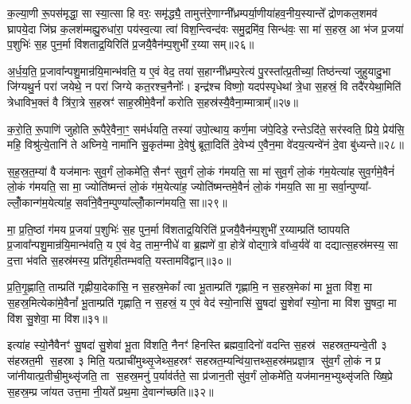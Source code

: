 क॒ल्या॒णी रू॒पस॑मृद्धा॒ सा स्या॒त्सा हि वरः॒ समृ॑द्ध्यै॒ तामुत्त॑रे॒णाग्नी᳚ध्रम्पर्या॒णीया॑हव॒नीय॒स्यान्ते᳚ द्रोणकल॒शमव॑ घ्रापये॒दा जि॑घ्र क॒लश॑म्मह्यु॒रुधा॑रा॒ पय॑स्व॒त्या त्वा॑ विश॒न्त्विन्द॑वः समु॒द्रमि॑व॒ सिन्ध॑वः॒ सा मा॑ स॒हस्र॒ आ भ॑ज प्र॒जया॑ प॒शुभिः॑ स॒ह पुन॒र्मा वि॑शताद्र॒यिरिति॑ प्र॒जयै॒वैन॑म्प॒शुभी॑ र॒य्या सम्॥२६॥

अ॒र्ध॒य॒ति॒ प्र॒जावा᳚न्पशु॒मान्र॑यि॒मान्भ॑वति॒ य ए॒वं वेद॒ तया॑ स॒हाग्नी᳚ध्रम्प॒रेत्य॑ पु॒रस्ता᳚त्प्र॒तीच्यां॒ तिष्ठ॑न्त्यां जुहुयादु॒भा जि॑ग्यथु॒र्न परा॑ जयेथे॒ न परा॑ जिग्ये कत॒रश्च॒नैनोः᳚। इन्द्र॑श्च विष्णो॒ यदप॑स्पृधेथां त्रे॒धा स॒हस्रं॒ वि तदै॑रयेथा॒मिति॑ त्रेधाविभ॒क्तं वै त्रि॑रा॒त्रे स॒हस्रꣳ॑ साह॒स्रीमे॒वैनां᳚ करोति स॒हस्र॑स्यै॒वैना॒म्मात्राम्᳚॥२७॥

क॒रो॒ति॒ रू॒पाणि॑ जुहोति रू॒पैरे॒वैना॒ꣳ॒ सम॑र्धयति॒ तस्या॑ उपो॒त्थाय॒ कर्ण॒मा ज॑पे॒दिडे॒ रन्ते\-ऽदि॑ते॒ सर॑स्वति॒ प्रिये॒ प्रेय॑सि॒ महि॒ विश्रु॑त्ये॒तानि॑ ते अघ्निये॒ नामा॑नि सु॒कृत॑म्मा दे॒वेषु॑ ब्रूता॒दिति॑ दे॒वेभ्य॑ ए॒वैन॒मा वे॑दय॒त्यन्वे॑नं दे॒वा बु॑ध्यन्ते॥२८॥

{\anuvakamend[{ए॒तदे॒तस्यां᳚ वी॒र्य॑मस्य त्रि॒भिश्च॑ द॒त्ता स॑हस्रत॒मी तस्मा॑दे॒व वरः॒ सम्मात्रा॒मेका॒न्नच॑त्वारि॒ꣳ॒शच्च॑॥६॥}]}

स॒ह॒स्र॒त॒म्या॑ वै यज॑मानः सुव॒र्गं लो॒कमे॑ति॒ सैनꣳ॑ सुव॒र्गं लो॒कं ग॑मयति॒ सा मा॑ सुव॒र्गं लो॒कं ग॑म॒येत्या॑ह सुव॒र्गमे॒वैनं॑ लो॒कं ग॑मयति॒ सा मा॒ ज्योति॑ष्मन्तं लो॒कं ग॑म॒येत्या॑ह॒ ज्योति॑ष्मन्तमे॒वैनं॑ लो॒कं ग॑मय॒ति सा मा॒ सर्वा॒न्पुण्या᳚- ल्लोँ॒कान्ग॑म॒येत्या॑ह॒ सर्वा॑ने॒वैन॒म्पुण्या᳚ल्लोँ॒कान्ग॑मयति॒ सा॥२९॥

मा॒ प्र॒ति॒ष्ठां ग॑मय प्र॒जया॑ प॒शुभिः॑ स॒ह पुन॒र्मा वि॑शताद्र॒यिरिति॑ प्र॒जयै॒वैन॑म्प॒शुभी॑ र॒य्याम्प्रति॑ ष्ठापयति प्र॒जावा᳚न्पशु॒मान्र॑यि॒मान्भ॑वति॒ य ए॒वं वेद॒ ताम॒ग्नीधे॑ वा ब्र॒ह्मणे॑ वा॒ होत्रे॑ वोद्गा॒त्रे वा᳚ध्व॒र्यवे॑ वा दद्यात्स॒हस्र॑मस्य॒ सा द॒त्ता भ॑वति स॒हस्र॑मस्य॒ प्रति॑गृहीतम्भवति॒ यस्तामवि॑द्वान्॥३०॥

प्र॒ति॒गृ॒ह्णाति॒ ताम्प्रति॑ गृह्णीया॒देका॑सि॒ न स॒हस्र॒मेकां᳚ त्वा भू॒ताम्प्रति॑ गृह्णामि॒ न स॒हस्र॒मेका॑ मा भू॒ता वि॑श॒ मा स॒हस्र॒मित्येका॑मे॒वैनां᳚ भू॒ताम्प्रति॑ गृह्णाति॒ न स॒हस्रं॒ य ए॒वं वेद॑ स्यो॒नासि॑ सु॒षदा॑ सु॒शेवा᳚ स्यो॒ना मा वि॑श सु॒षदा॒ मा वि॑श सु॒शेवा॒ मा वि॑श॥३१॥

इत्या॑ह स्यो॒नैवैनꣳ॑ सु॒षदा॑ सु॒शेवा॑ भू॒ता वि॑शति॒ नैनꣳ॑ हिनस्ति ब्रह्मवा॒दिनो॑ वदन्ति स॒हस्र॑ सहस्रत॒म्यन्वे॒ती ३ स॑हस्रत॒मी स॒हस्रा ३ मिति॒ यत्प्राची॑मुथ्सृ॒जेथ्स॒हस्रꣳ॑ सहस्रत॒म्यन्वि॑या॒त्तथ्स॒हस्र॑मप्रज्ञा॒त्र सु॑व॒र्गं लो॒कं न प्र जा॑नीयात्प्र॒तीची॒मुथ्सृ॑जति॒ ता स॒हस्र॒मनु॑ प॒र्याव॑र्तते॒ सा प्र॑जान॒ती सु॑व॒र्गं लो॒कमे॑ति॒ यज॑मानम॒भ्युथ्सृ॑जति ख्षि॒प्रे स॒हस्र॒म्प्र जा॑यत उत्त॒मा नी॒यते᳚ प्रथ॒मा दे॒वान्ग॑च्छति॥३२॥

